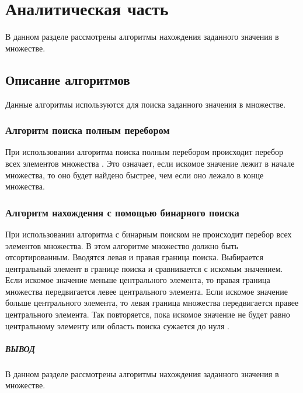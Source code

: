 \chapter{Аналитическая часть}

В данном разделе рассмотрены алгоритмы нахождения заданного значения в множестве.


\section{Описание алгоритмов}

Данные алгоритмы используются для поиска заданного значения в множестве.

\subsection{Алгоритм поиска полным перебором}

При использовании алгоритма поиска полным перебором происходит перебор всех
элементов множества \cite{bib0}. Это означает, если искомое значение лежит в начале множества,
то оно будет найдено быстрее, чем если оно лежало в конце множества.


\subsection{Алгоритм нахождения с помощью бинарного поиска}

При использовании алгоритма с бинарным поиском не происходит
перебор всех элементов множества. В этом алгоритме множество должно быть
отсортированным. Вводятся левая и правая граница поиска.
Выбирается центральный элемент в границе поиска и сравнивается с искомым значением.
Если искомое значение меньше центрального элемента, то правая граница множества
передвигается левее центрального элемента. Если
искомое значение больше центрального элемента, то левая граница множества
передвигается правее центрального элемента. Так повторяется, пока искомое
значение не будет равно центральному элементу или область поиска сужается до нуля \cite{bib1}.

\clearpage

\paragraph*{ВЫВОД} ${}$ \\

В данном разделе рассмотрены алгоритмы нахождения заданного значения в множестве.




